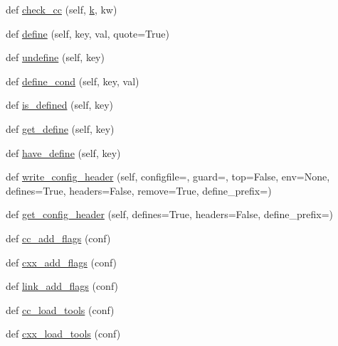 \begin{DoxyCompactItemize}
def \hyperlink{namespacewaflib_1_1_tools_1_1c__config_aafa88569174a7bd6959eb079e45f9e5f}{check\+\_\+cc} (self, \hyperlink{rfft2d_test_m_l_8m_adc468c70fb574ebd07287b38d0d0676d}{k}, kw)
\item 
def \hyperlink{namespacewaflib_1_1_tools_1_1c__config_aefc8712a0a3e7664272e76d085178811}{define} (self, key, val, quote=True)
\item 
def \hyperlink{namespacewaflib_1_1_tools_1_1c__config_aeb8ffd395ba266ee2d8c980363c24a88}{undefine} (self, key)
\item 
def \hyperlink{namespacewaflib_1_1_tools_1_1c__config_a636c9eacb867877684f412620a6b6b6a}{define\+\_\+cond} (self, key, val)
\item 
def \hyperlink{namespacewaflib_1_1_tools_1_1c__config_a1478f0bc62d743d26996a86b25d14a74}{is\+\_\+defined} (self, key)
\item 
def \hyperlink{namespacewaflib_1_1_tools_1_1c__config_a1f04496a9a6d169183ad82bb7b6df607}{get\+\_\+define} (self, key)
\item 
def \hyperlink{namespacewaflib_1_1_tools_1_1c__config_a10f2fd410b28bac19d8a1cf226150bd2}{have\+\_\+define} (self, key)
\item 
def \hyperlink{namespacewaflib_1_1_tools_1_1c__config_a431d2b1c6dccecd7d62c51a6348434bc}{write\+\_\+config\+\_\+header} (self, configfile=\textquotesingle{}\textquotesingle{}, guard=\textquotesingle{}\textquotesingle{}, top=False, env=None, defines=True, headers=False, remove=True, define\+\_\+prefix=\textquotesingle{}\textquotesingle{})
\item 
def \hyperlink{namespacewaflib_1_1_tools_1_1c__config_a0c69508d77befbcea1727b1a135fc83a}{get\+\_\+config\+\_\+header} (self, defines=True, headers=False, define\+\_\+prefix=\textquotesingle{}\textquotesingle{})
\item 
def \hyperlink{namespacewaflib_1_1_tools_1_1c__config_a60f244c4a4f5fc5f5c97a608ef15a4f9}{cc\+\_\+add\+\_\+flags} (conf)
\item 
def \hyperlink{namespacewaflib_1_1_tools_1_1c__config_a68d43a67259ff2dc914e1a4e46a8d876}{cxx\+\_\+add\+\_\+flags} (conf)
\item 
def \hyperlink{namespacewaflib_1_1_tools_1_1c__config_a3dc8e6c2c3381ead4f4fd243414bd081}{link\+\_\+add\+\_\+flags} (conf)
\item 
def \hyperlink{namespacewaflib_1_1_tools_1_1c__config_a4b0405110f79509aa25cf9830827c7ac}{cc\+\_\+load\+\_\+tools} (conf)
\item 
def \hyperlink{namespacewaflib_1_1_tools_1_1c__config_a2c649c982fe806a7c7d612e0fdf9625d}{cxx\+\_\+load\+\_\+tools} (conf)

\end{DoxyCompactItemize}
